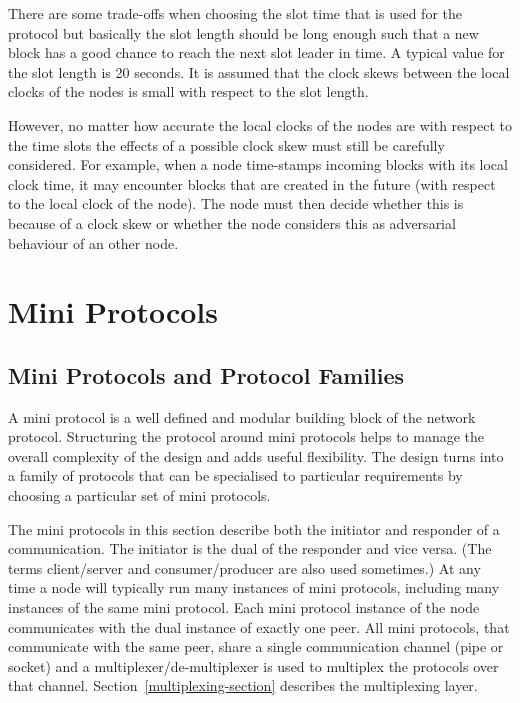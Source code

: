 \documentclass{report}
\newcommand{\wip}[1]{\color{magenta}{#1}\color{black}}
\theoremstyle{definition}{
  \newtheorem{lemma}{Lemma}[section] %
  \newtheorem{definition}[lemma]{Definition}
}
\theoremstyle{theorem}{
  \newtheorem{invariant}[lemma]{Invariant}
  \newtheorem{proofobligation}[lemma]{Proof Obligation}
}
\numberwithin{equation}{lemma}
\begin{document}
There are some trade-offs when choosing the slot time that is used for the protocol but
basically the slot length should be long enough such that a new block has a good chance to reach the
next slot leader in time.
A typical value for the slot length is 20 seconds.
It is assumed that the clock skews between the local clocks of the nodes is small with respect to the
slot length.

However, no matter how accurate the local clocks of the nodes are with respect to the time slots
the effects of a possible clock skew must still be carefully considered.
For example, when a node time-stamps incoming blocks with its local clock time, it may encounter
blocks that are created in the future
(with respect to the local clock of the node).
The node must then decide whether this is because of a clock skew or whether the node considers this
as adversarial behaviour of an other node.

\wip{TODO :: get feedback from the researchers on this. Tentative policy: allow 200ms to 1s
explain the problem in detail.
A node cannot forward a block from the future.
This is complicated !
}

\chapter{Mini Protocols}
\label{state-machine-section}

\section{Mini Protocols and Protocol Families}
A mini protocol is a well defined and modular building block of
the network protocol.
Structuring the protocol around mini protocols helps to manage the overall complexity of
the design and adds useful flexibility.
The design turns into a family of protocols that can be specialised to particular requirements
by choosing a particular set of mini protocols.

The mini protocols in this section describe both the initiator and responder of a communication.
The initiator is the dual of the responder and vice versa.
(The terms client/server and consumer/producer are also used sometimes.)
At any time a node will typically run many instances of mini protocols, including many instances of the
same mini protocol.
Each mini protocol instance of the node communicates with the dual
instance of exactly one peer.
All mini protocols, that communicate with the same peer,
share a single communication channel (pipe or socket)
and a multiplexer/de-multiplexer is used to multiplex the protocols over that channel.
Section~\ref{multiplexing-section} describes the multiplexing layer.
\end{document}

